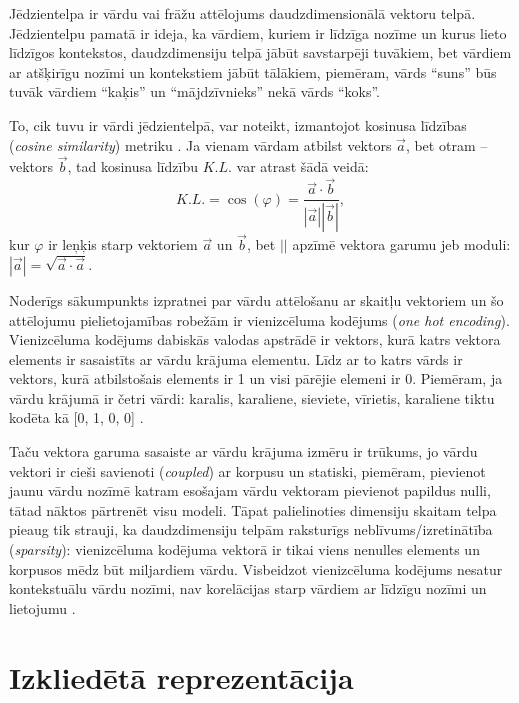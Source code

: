 Jēdzientelpa ir vārdu vai frāžu attēlojums daudzdimensionālā vektoru telpā. Jēdzientelpu pamatā ir ideja, ka vārdiem, kuriem ir līdzīga nozīme un kurus lieto līdzīgos kontekstos, daudzdimensiju telpā jābūt savstarpēji tuvākiem, bet vārdiem ar atšķirīgu nozīmi un kontekstiem jābūt tālākiem, piemēram, vārds “suns” būs tuvāk vārdiem “kaķis” un “mājdzīvnieks” nekā vārds “koks”.

To, cik tuvu ir vārdi jēdzientelpā, var noteikt, izmantojot kosinusa līdzības (\textit{cosine similarity}) metriku \cite{dangeti2017}. Ja vienam vārdam atbilst vektors $\vec{a}$, bet otram -- vektors $\vec{b}$, tad kosinusa līdzību $K.L.$ var atrast šādā veidā: $$K.L. = \cos(\varphi) = \frac{\vec{a} \cdot \vec{b}}{|\vec{a}| |\vec{b}|},$$ 
kur $\varphi$ ir leņķis starp vektoriem $\vec{a}$ un $\vec{b}$, bet $||$ apzīmē vektora garumu jeb moduli: $|\vec{a}| = \sqrt{\vec{a} \cdot \vec{a}}$.



Noderīgs sākumpunkts izpratnei par vārdu attēlošanu ar skaitļu vektoriem un šo attēlojumu pielietojamības robežām ir vienizcēluma kodējums (\textit{one hot encoding}). Vienizcēluma kodējums dabiskās valodas apstrādē ir vektors, kurā katrs vektora elements ir sasaistīts ar vārdu krājuma elementu. Līdz ar to katrs vārds ir vektors, kurā atbilstošais elements ir 1 un visi pārējie elemeni ir 0. Piemēram, ja vārdu krājumā ir četri vārdi: karalis, karaliene, sieviete, vīrietis, karaliene tiktu kodēta kā [0, 1, 0, 0] \cite{colyer2016}.

Taču vektora garuma sasaiste ar vārdu krājuma izmēru ir trūkums, jo vārdu vektori ir cieši savienoti (\textit{coupled}) ar korpusu un statiski, piemēram, pievienot jaunu vārdu nozīmē katram esošajam vārdu vektoram pievienot papildus nulli, tātad nāktos pārtrenēt visu modeli. Tāpat palielinoties dimensiju skaitam telpa pieaug tik strauji, ka daudzdimensiju telpām raksturīgs neblīvums/izretinātība (\textit{sparsity}): vienizcēluma kodējuma vektorā ir tikai viens nenulles elements un korpusos mēdz būt miljardiem 
vārdu. Visbeidzot vienizcēluma kodējums nesatur kontekstuālu vārdu nozīmi, nav korelācijas starp vārdiem ar līdzīgu nozīmi un lietojumu \cite{colyer2016}.


\section{Izkliedētā reprezentācija}

